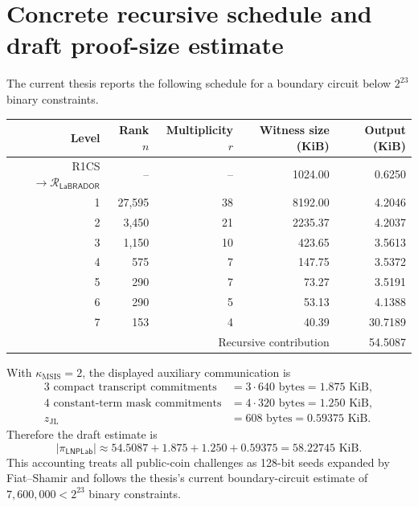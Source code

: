 \documentclass[11pt,a4paper]{article}
\newcommand{\LaB}{\mathsf{LaBRADOR}}
\newcommand{\LNPLab}{\mathsf{LNPLab}}
\newcommand{\abs}[1]{\left\lvert #1\right\rvert}
\newcommand{\calR}{\mathcal{R}}
\begin{document}
\section{Concrete recursive schedule and draft proof-size estimate}

The current thesis reports the following schedule for a boundary circuit below
\(2^{23}\) binary constraints.

\begin{center}
\begin{tabular}{@{}rrrrr@{}}
\toprule
Level & Rank \(n\) & Multiplicity \(r\) & Witness size (KiB) & Output (KiB)\\
\midrule
R1CS \(\to\calR_{\LaB}\) & -- & -- & 1024.00 & 0.6250\\
1 & 27,595 & 38 & 8192.00 & 4.2046\\
2 & 3,450 & 21 & 2235.37 & 4.2037\\
3 & 1,150 & 10 & 423.65 & 3.5613\\
4 & 575 & 7 & 147.75 & 3.5372\\
5 & 290 & 7 & 73.27 & 3.5191\\
6 & 290 & 5 & 53.13 & 4.1388\\
7 & 153 & 4 & 40.39 & 30.7189\\
\midrule
\multicolumn{4}{r}{Recursive contribution} & 54.5087\\
\bottomrule
\end{tabular}
\end{center}

With \(\kappa_{\mathrm{MSIS}}=2\), the displayed auxiliary communication is
\begin{align*}
  3\text{ compact transcript commitments}
    &=3\cdot640\text{ bytes}=1.875\text{ KiB},\\
  4\text{ constant-term mask commitments}
    &=4\cdot320\text{ bytes}=1.250\text{ KiB},\\
  z_{\mathrm{JL}}
    &=608\text{ bytes}=0.59375\text{ KiB}.
\end{align*}
Therefore the draft estimate is
\begin{equation}
  \abs{\pi_{\LNPLab}}
  \approx54.5087+1.875+1.250+0.59375
  =58.22745\text{ KiB}.
  \label{eq:draft-proof-size}
\end{equation}
This accounting treats all public-coin challenges as 128-bit seeds expanded by
Fiat--Shamir and follows the thesis's current boundary-circuit estimate of
\(7{,}600{,}000<2^{23}\) binary constraints.
\end{document}
